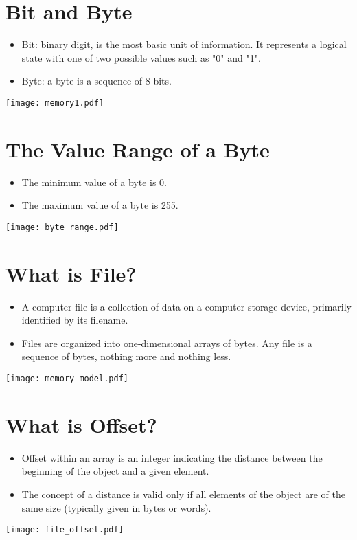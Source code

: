 \documentclass[en,hazy,blue,screen,14pt]{elegantnote}
\begin{document}
\section{Bit and Byte}
\begin{itemize}
	\item Bit: binary digit, is the most basic unit of information. It represents a logical state with one of two possible values such as "0" and "1".
	\item Byte: a byte is a sequence of 8 bits.
\end{itemize}
\centerline{\texttt{[image: memory1.pdf]}}

\newpage
\section{The Value Range of a Byte}
\begin{itemize}
	\item The minimum value of a byte is 0.
	\item The maximum value of a byte is 255.
\end{itemize}
\centerline{\texttt{[image: byte\_range.pdf]}}

\newpage
\section{What is File?}
\begin{itemize}
	\item A computer file is a collection of data on a computer storage device, primarily identified by its filename.
	\item Files are organized into one-dimensional arrays of bytes. Any file is a sequence of bytes, nothing more and nothing less.
\end{itemize}
\centerline{\texttt{[image: memory\_model.pdf]}}

\newpage
\section{What is Offset?}
\begin{itemize}
	\item Offset within an array is an integer indicating the distance between the beginning of the object and a given element.
	\item The concept of a distance is valid only if all elements of the object are of the same size (typically given in bytes or words).
\end{itemize}
\centerline{\texttt{[image: file\_offset.pdf]}}
\end{document}
